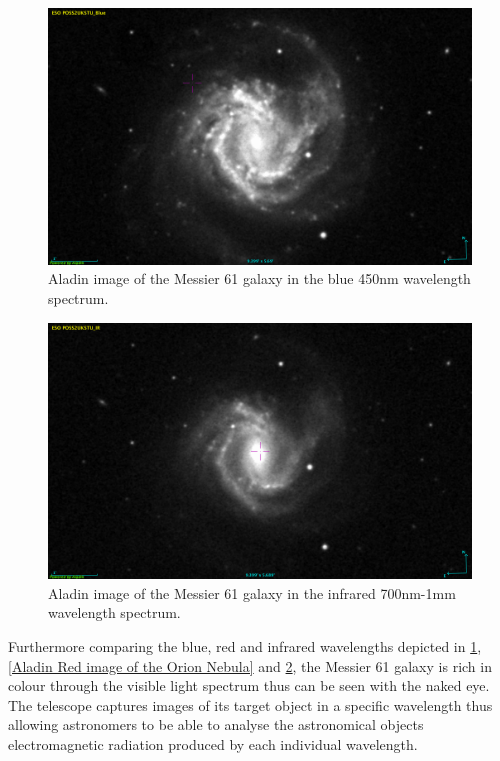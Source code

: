 \documentclass[12pt]{article}
\begin{document}
\begin{multicols}{2}
\begin{figure}[H]
\centering
\includegraphics[scale=0.22]{Images/As_Images/M61Blue.png}
\caption{Aladin image of the Messier 61 galaxy in the blue 450nm wavelength spectrum.}
\label{Aladin Blue image of the Orion Nebula}
\end{figure}

\begin{figure}[H]
\centering
\includegraphics[scale=0.22]{Images/As_Images/M61IR.png}
\caption{Aladin image of the Messier 61 galaxy in the infrared 700nm-1mm wavelength spectrum.}
\label{Aladin IR image of the Orion Nebula}
\end{figure}
\end{multicols}
\vspace{0.2cm}

Furthermore comparing the blue, red and infrared wavelengths depicted in \cref{Aladin Blue image of the Orion Nebula}, \cref{Aladin Red image of the Orion Nebula} and \cref{Aladin IR image of the Orion Nebula}, the Messier 61 galaxy is rich in colour through the visible light spectrum thus can be seen with the naked eye. The telescope captures images of its target object in a specific wavelength thus allowing astronomers to be able to analyse the astronomical objects electromagnetic radiation produced by each individual wavelength. 
\end{document}
